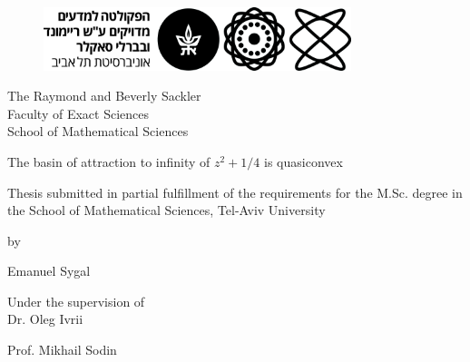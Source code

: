 

\usepackage{subcaption}



\begin{figure}[H]
\centering{}\includegraphics[width=0.8\textwidth]{figures/Logo_Exact_Sciences_Hebrew_Black.jpeg}
\end{figure}

\begin{center}
The Raymond and Beverly Sackler\\
Faculty of Exact Sciences\\
School of Mathematical Sciences
\par\end{center}

\begin{doublespace}
\begin{center}
{\LARGE{}The basin of attraction to infinity of $z^2+1/4$ is quasiconvex}{\LARGE\par}
\par\end{center}
\end{doublespace}

\begin{center}
Thesis submitted in partial fulfillment of the requirements for the
M.Sc. degree in the School of Mathematical Sciences, Tel-Aviv University
\par\end{center}

\begin{doublespace}
\begin{center}
by
\par\end{center}

\begin{center}
{\large{}Emanuel Sygal}{\large\par}
\par\end{center}
\end{doublespace}

\begin{center}
Under the supervision of\\
{\huge{}Dr. Oleg Ivrii}{\huge\par}
{\huge{}Prof. Mikhail Sodin}{\huge\par}

\par\end{center}


